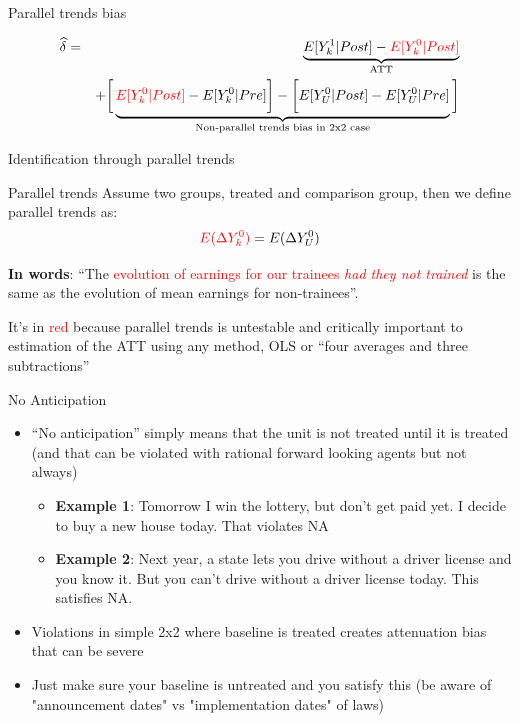 \documentclass{beamer}
\begin{document}
\begin{frame}{Parallel trends bias}

\begin{eqnarray*}
\widehat{\delta} &=& \underbrace{E[Y^1_k | Post] - \textcolor{red}{E[Y^0_k | Post]}}_{\mathclap{\text{ATT}}} \\
&& + \bigg [  \underbrace{\textcolor{red}{E[Y^0_k | Post]} - E[Y^0_k | Pre] \bigg ] - \bigg [ E[Y^0_U | Post] - E[Y_U^0 | Pre] }_{\mathclap{\text{Non-parallel trends bias in 2x2 case}}} \bigg ]
\end{eqnarray*}


\end{frame}

\begin{frame}{Identification through parallel trends}
	

	\begin{block}{Parallel trends}
	Assume two groups, treated and comparison group, then we define parallel trends as:	 $$\textcolor{red}{E(}\textcolor{red}{\Delta Y^0_k)} = E(\Delta Y^0_U)$$
	\end{block}

\textbf{In words}: ``The \textcolor{red}{evolution of earnings for our trainees \emph{had they not trained}} is the same as the evolution of mean earnings for non-trainees''.  

\bigskip

It's in \textcolor{red}{red} because parallel trends is untestable and critically important to estimation of the ATT using any method, OLS or ``four averages and three subtractions''

\end{frame}

\begin{frame}{No Anticipation}

\begin{itemize}
\item ``No anticipation'' simply means that the unit is not treated until it is treated (and that can be violated with rational forward looking agents but not always)
	\begin{itemize}
	\item \textbf{Example 1}: Tomorrow I win the lottery, but don't get paid yet. I decide to buy a new house today. That violates NA
	\item \textbf{Example 2}: Next year, a state lets you drive without a driver license and you know it. But you can't drive without a driver license today.  This satisfies NA.
	\end{itemize}
\item Violations in simple 2x2 where baseline is treated creates attenuation bias that can be severe 
\item Just make sure your baseline is untreated and you satisfy this (be aware of "announcement dates" vs "implementation dates" of laws)

\end{itemize}

\end{frame}
\end{document}
